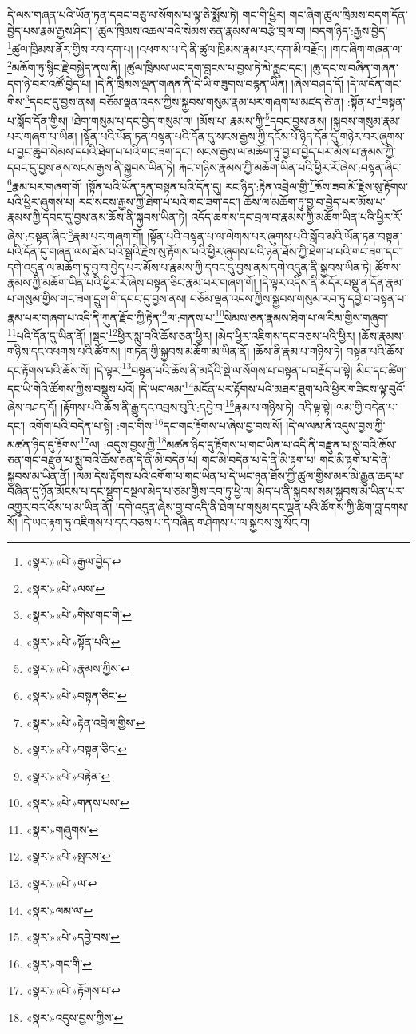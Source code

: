 དེ་ལས་གཞན་པའི་ཡོན་ཏན་དབང་བཅུ་ལ་སོགས་པ་ལྟ་ཅི་སྨོས་ཏེ། གང་གི་ཕྱིར། གང་ཞིག་ཚུལ་ཁྲིམས་བདག་དོན་བྱེད་པས་རྣམ་རྒྱས་ཤིང་། །ཚུལ་ཁྲིམས་འཆལ་བའི་སེམས་ཅན་རྣམས་ལ་བརྩེ་བྲལ་བ། །བདག་ཉིད་:རྒྱས་བྱེད་\footnote{«སྣར་»«པེ་»རྒྱལ་བྱེད་}ཚུལ་ཁྲིམས་ནོར་གྱིས་རབ་དག་པ། །འཕགས་པ་དེ་ནི་ཚུལ་ཁྲིམས་རྣམ་པར་དག་མི་བརྗོད། །གང་ཞིག་གཞན་ལ་\footnote{«སྣར་»«པེ་»ལས་}མཆོག་ཏུ་སྙིང་རྗེ་བསྐྱེད་ནས་ནི། །ཚུལ་ཁྲིམས་ཡང་དག་བླངས་པ་བྱས་ཏེ་མེ་རླུང་དང་། །ཆུ་དང་ས་བཞིན་གཞན་དག་ཉེ་བར་འཚོ་བྱེད་པ། །དེ་ནི་ཁྲིམས་ལྡན་གཞན་ནི་དེ་ཡི་གཟུགས་བརྙན་ཡིན། །ཞེས་བཤད་དོ། །དེ་ལ་དོན་གང་གིས་\footnote{«སྣར་»«པེ་»གིས་གང་གི་}དབང་དུ་བྱས་ནས། བཅོམ་ལྡན་འདས་ཀྱིས་སྐྱབས་གསུམ་རྣམ་པར་གཞག་པ་མཛད་ཅེ་ན། :སྟོན་པ་\footnote{«སྣར་»«པེ་»སྟོན་པའི་}བསྟན་པ་སློབ་དོན་གྱིས། །ཐེག་གསུམ་པ་དང་བྱེད་གསུམ་ལ། །མོས་པ་:རྣམས་ཀྱི་\footnote{«སྣར་»«པེ་»རྣམས་ཀྱིས་}དབང་བྱས་ནས། །སྐྱབས་གསུམ་རྣམ་པར་གཞག་པ་ཡིན། །སྟོན་པའི་ཡོན་ཏན་བསྟན་པའི་དོན་དུ་སངས་རྒྱས་ཀྱི་དངོས་པོ་ཉིད་དོན་དུ་གཉེར་བར་ཞུགས་པ་བྱང་ཆུབ་སེམས་དཔའི་ཐེག་པ་པའི་གང་ཟག་དང་། སངས་རྒྱས་ལ་མཆོག་ཏུ་བྱ་བ་བྱེད་པར་མོས་པ་རྣམས་ཀྱི་དབང་དུ་བྱས་ནས་སངས་རྒྱས་ནི་སྐྱབས་ཡིན་ཏེ། རྐང་གཉིས་རྣམས་ཀྱི་མཆོག་ཡིན་པའི་ཕྱིར་རོ་ཞེས་:བསྟན་ཞིང་\footnote{«སྣར་»«པེ་»བསྟན་ཅིང་}རྣམ་པར་གཞག་གོ། །སྟོན་པའི་ཡོན་ཏན་བསྟན་པའི་དོན་དུ། རང་ཉིད་:རྟེན་འབྲེལ་གྱི་\footnote{«སྣར་»«པེ་»རྟེན་འབྲེལ་གྱིས་}ཆོས་ཟབ་མོ་རྗེས་སུ་རྟོགས་པའི་ཕྱིར་ཞུགས་པ། རང་སངས་རྒྱས་ཀྱི་ཐེག་པ་པའི་གང་ཟག་དང་། ཆོས་ལ་མཆོག་ཏུ་བྱ་བ་བྱེད་པར་མོས་པ་རྣམས་ཀྱི་དབང་དུ་བྱས་ནས་ཆོས་ནི་སྐྱབས་ཡིན་ཏེ། འདོད་ཆགས་དང་བྲལ་བ་རྣམས་ཀྱི་མཆོག་ཡིན་པའི་ཕྱིར་རོ་ཞེས་:བསྟན་ཞིང་\footnote{«སྣར་»«པེ་»བསྟན་ཅིང་}རྣམ་པར་གཞག་གོ། །སྟོན་པའི་བསྟན་པ་ལ་ལེགས་པར་ཞུགས་པའི་སློབ་མའི་ཡོན་ཏན་བསྟན་པའི་དོན་དུ་གཞན་ལས་ཐོས་པའི་སྒྲའི་རྗེས་སུ་རྟོགས་པའི་ཕྱིར་ཞུགས་པའི་ཉན་ཐོས་ཀྱི་ཐེག་པ་པའི་གང་ཟག་དང་། དགེ་འདུན་ལ་མཆོག་ཏུ་བྱ་བ་བྱེད་པར་མོས་པ་རྣམས་ཀྱི་དབང་དུ་བྱས་ནས་དགེ་འདུན་ནི་སྐྱབས་ཡིན་ཏེ། ཚོགས་རྣམས་ཀྱི་མཆོག་ཡིན་པའི་ཕྱིར་རོ་ཞེས་བསྟན་ཅིང་རྣམ་པར་གཞག་གོ། །དེ་ལྟར་འདིས་ནི་མདོར་བསྡུ་ན་དོན་རྣམ་པ་གསུམ་གྱིས་གང་ཟག་དྲུག་གི་དབང་དུ་བྱས་ནས། བཅོམ་ལྡན་འདས་ཀྱིས་སྐྱབས་གསུམ་རབ་ཏུ་དབྱེ་བ་བསྟན་པ་རྣམ་པར་གཞག་པ་འདི་ནི་ཀུན་རྫོབ་ཀྱི་རྟེན་\footnote{«སྣར་»«པེ་»བརྟེན་}ལ་:གནས་པ་\footnote{«སྣར་»«པེ་»གནས་པས་}སེམས་ཅན་རྣམས་ཐེག་པ་ལ་རིམ་གྱིས་གཞུག་\footnote{«སྣར་»གཞུགས་}པའི་དོན་དུ་ཡིན་ནོ། །སྡང་\footnote{«སྣར་»«པེ་»སྤངས་}ཕྱིར་སླུ་བའི་ཆོས་ཅན་ཕྱིར། །མེད་ཕྱིར་འཇིགས་དང་བཅས་པའི་ཕྱིར། །ཆོས་རྣམས་གཉིས་དང་འཕགས་པའི་ཚོགས། །གཏན་གྱི་སྐྱབས་མཆོག་མ་ཡིན་ནོ། །ཆོས་ནི་རྣམ་པ་གཉིས་ཏེ། བསྟན་པའི་ཆོས་དང་རྟོགས་པའི་ཆོས་སོ། །དེ་ལྟར་\footnote{«སྣར་»«པེ་»ལ་}བསྟན་པའི་ཆོས་ནི་མདོའི་སྡེ་ལ་སོགས་པ་བསྟན་པ་བརྗོད་པ་སྟེ། མིང་དང་ཚིག་དང་ཡི་གེའི་ཚོགས་ཀྱིས་བསྡུས་པའོ། །དེ་ཡང་ལམ་\footnote{«སྣར་»ལམ་ལ་}མངོན་པར་རྟོགས་པའི་མཐར་ཐུག་པའི་ཕྱིར་གཟིངས་ལྟ་བུའོ་ཞེས་བཤད་དོ། །རྟོགས་པའི་ཆོས་ནི་རྒྱུ་དང་འབྲས་བུའི་:དབྱེ་བ་\footnote{«སྣར་»«པེ་»དབྱེ་བས་}རྣམ་པ་གཉིས་ཏེ། འདི་ལྟ་སྟེ། ལམ་གྱི་བདེན་པ་དང་། འགོག་པའི་བདེན་པ་སྟེ། :གང་གིས་\footnote{«སྣར་»གང་གི་}དང་གང་རྟོགས་པ་ཞེས་བྱ་བས་སོ། །དེ་ལ་ལམ་ནི་འདུས་བྱས་ཀྱི་མཚན་ཉིད་དུ་རྟོགས་\footnote{«སྣར་»«པེ་»རྟོགས་པ་}ལ། :འདུས་བྱས་ཀྱི་\footnote{«སྣར་»འདུས་བྱས་ཀྱིས་}མཚན་ཉིད་དུ་རྟོགས་པ་གང་ཡིན་པ་འདི་ནི་བརྫུན་པ་སླུ་བའི་ཆོས་ཅན་གང་བརྫུན་པ་སླུ་བའི་ཆོས་ཅན་དེ་ནི་མི་བདེན་པ། གང་མི་བདེན་པ་དེ་ནི་མི་རྟག་པ། གང་མི་རྟག་པ་དེ་ནི་སྐྱབས་མ་ཡིན་ནོ། །ལམ་དེས་རྟོགས་པའི་འགོག་པ་གང་ཡིན་པ་དེ་ཡང་ཉན་ཐོས་ཀྱི་ཚུལ་གྱིས་མར་མེ་རྒྱུན་ཆད་པ་བཞིན་དུ་ཉོན་མོངས་པ་དང་སྡུག་བསྔལ་མེད་པ་ཙམ་གྱིས་རབ་ཏུ་ཕྱེ་ལ། མེད་པ་ནི་སྐྱབས་སམ་སྐྱབས་མ་ཡིན་པར་འགྱུར་བར་འོས་པ་མ་ཡིན་ནོ། །དགེ་འདུན་ཞེས་བྱ་བ་འདི་ནི་ཐེག་པ་གསུམ་དང་ལྡན་པའི་ཚོགས་ཀྱི་ཚིག་བླ་དགས་སོ། །དེ་ཡང་རྟག་ཏུ་འཇིགས་པ་དང་བཅས་པ་དེ་བཞིན་གཤེགས་པ་ལ་སྐྱབས་སུ་སོང་བ། 